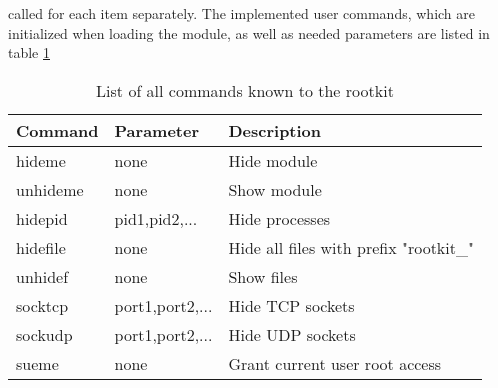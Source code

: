 called for each item separately. The implemented user commands, which are initialized when loading the module, as well as needed parameters are listed in table \ref{tab:com}
\begin{table}[h]
\centering
\begin{tabular}{|l|l|l|}
\hline
Command & Parameter & Description \\\hline\hline
hideme & none & Hide module \\\hline
unhideme & none & Show module \\\hline
hidepid & pid1,pid2,... & Hide processes \\\hline
hidefile & none & Hide all files with prefix "rootkit\_"\\\hline
unhidef & none & Show files \\\hline
socktcp & port1,port2,... & Hide TCP sockets \\\hline
sockudp & port1,port2,... & Hide UDP sockets \\\hline
sueme & none & Grant current user root access\\\hline
\end{tabular}
\caption{List of all commands known to the rootkit}
\label{tab:com}
\end{table}
